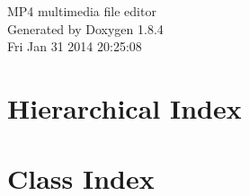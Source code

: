 \documentclass[twoside]{book}
\newcommand{\clearemptydoublepage}{%
  \newpage{\pagestyle{empty}\cleardoublepage}%
}
\begin{document}
\hypersetup{pageanchor=false}
\begin{titlepage}
\vspace*{7cm}
\begin{center}%
{\Large M\-P4 multimedia file editor }\\
\vspace*{1cm}
{\large Generated by Doxygen 1.8.4}\\
\vspace*{0.5cm}
{\small Fri Jan 31 2014 20:25:08}\\
\end{center}
\end{titlepage}
\clearemptydoublepage
\tableofcontents
\clearemptydoublepage
{}
\hypersetup{pageanchor=true}

\chapter{Hierarchical Index}

\chapter{Class Index}

\end{document}
